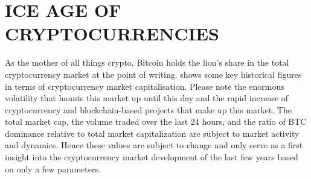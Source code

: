 \chapter{ICE AGE OF CRYPTOCURRENCIES}
\label{ch:iceage}

As the mother of all things crypto, Bitcoin holds the lion's share in the total cryptocurrency market at the point of writing.  shows some key historical figures in terms of cryptocurrency market capitalisation. Please note the enormous volatility that haunts this market up until this day and the rapid increase of cryptocurrency and blockchain-based projects that make up this market. The total market cap, the volume traded over the last 24 hours, and the ratio of BTC dominance relative to total market capitalization are subject to market activity and dynamics. Hence these values are subject to change and only serve as a first insight into the cryptocurrency market development of the last few years based on only a few parameters.\medskip 


